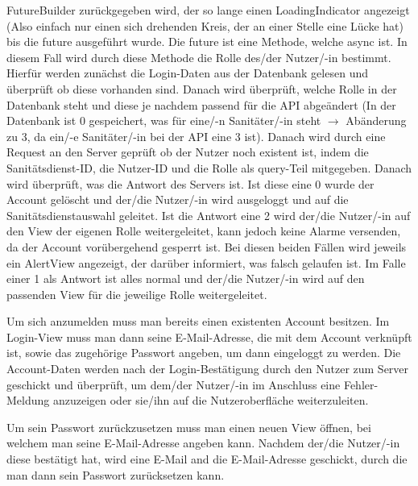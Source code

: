         FutureBuilder zurückgegeben wird, der so lange einen LoadingIndicator angezeigt
        (Also einfach nur einen sich drehenden Kreis, der an einer Stelle eine Lücke hat)
        bis die \glqq future\grqq{} ausgeführt wurde. Die future ist eine Methode, welche 
        async ist. In diesem Fall wird durch diese Methode die Rolle des/der Nutzer/-in 
        bestimmt. Hierfür werden zunächst die Login-Daten aus der Datenbank gelesen und 
        überprüft ob diese vorhanden sind. Danach wird überprüft, welche Rolle in der 
        Datenbank steht und diese je nachdem passend für die API abgeändert (In der 
        Datenbank ist 0 gespeichert, was für eine/-n Sanitäter/-in steht $\rightarrow$ 
        Abänderung zu 3, da ein/-e Sanitäter/-in bei der API eine 3 ist). Danach wird durch 
        eine Request an den Server geprüft ob der Nutzer noch existent ist, indem die 
        Sanitätsdienst-ID, die Nutzer-ID und die Rolle als query-Teil mitgegeben. Danach 
        wird überprüft, was die Antwort des Servers ist. Ist diese eine 0 wurde der Account 
        gelöscht und der/die Nutzer/-in wird ausgeloggt und auf die Sanitätsdienstauswahl 
        geleitet. Ist die Antwort eine 2 wird der/die Nutzer/-in auf den View der eigenen 
        Rolle weitergeleitet, kann jedoch keine Alarme versenden, da der Account 
        vorübergehend gesperrt ist. Bei diesen beiden Fällen wird jeweils ein AlertView 
        angezeigt, der darüber informiert, was \glqq falsch\grqq{} gelaufen ist.
        Im Falle einer 1 als Antwort ist alles normal und der/die Nutzer/-in wird auf den 
        passenden View für die jeweilige Rolle weitergeleitet. 

        Um sich anzumelden muss man bereits einen existenten Account 
        besitzen. Im Login-View muss man dann seine E-Mail-Adresse, die mit dem 
        Account verknüpft ist, sowie das zugehörige Passwort angeben, um dann 
        eingeloggt zu werden. Die Account-Daten werden nach der Login-Bestätigung
        durch den Nutzer zum Server geschickt und überprüft, um dem/der Nutzer/-in
        im Anschluss eine Fehler-Meldung anzuzeigen oder sie/ihn auf die 
        Nutzeroberfläche weiterzuleiten.

        Um sein Passwort zurückzusetzen muss man einen neuen View öffnen, 
        bei welchem man seine E-Mail-Adresse angeben kann. Nachdem der/die Nutzer/-in
        diese bestätigt hat, wird eine E-Mail and die E-Mail-Adresse geschickt, durch
        die man dann sein Passwort zurücksetzen kann.

